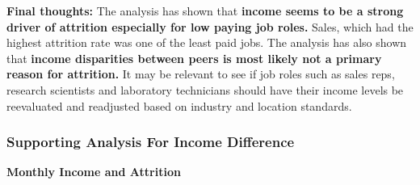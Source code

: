 \documentclass[
]{article}
\newenvironment{Shaded}{\begin{snugshade}}{\end{snugshade}}
\newcommand{\DataTypeTok}[1]{\textcolor[rgb]{0.13,0.29,0.53}{#1}}
\newcommand{\DecValTok}[1]{\textcolor[rgb]{0.00,0.00,0.81}{#1}}
\newcommand{\KeywordTok}[1]{\textcolor[rgb]{0.13,0.29,0.53}{\textbf{#1}}}
\newcommand{\NormalTok}[1]{#1}
\newcommand{\OperatorTok}[1]{\textcolor[rgb]{0.81,0.36,0.00}{\textbf{#1}}}
\newcommand{\StringTok}[1]{\textcolor[rgb]{0.31,0.60,0.02}{#1}}
\begin{document}
\textbf{Final thoughts:} The analysis has shown that \textbf{income
seems to be a strong driver of attrition especially for low paying job
roles.} Sales, which had the highest attrition rate was one of the least
paid jobs. The analysis has also shown that \textbf{income disparities
between peers is most likely not a primary reason for attrition.} It may
be relevant to see if job roles such as sales reps, research scientists
and laboratory technicians should have their income levels be
reevaluated and readjusted based on industry and location standards.

\hypertarget{supporting-analysis-for-income-difference}{%
\subsubsection{Supporting Analysis For Income
Difference}\label{supporting-analysis-for-income-difference}}

\textbf{Monthly Income and Attrition}

\begin{Shaded}
\end{Shaded}
\end{document}

